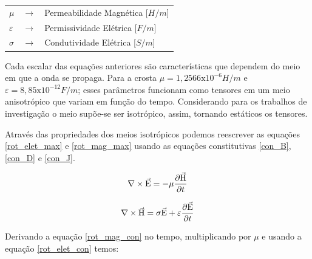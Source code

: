	        {\footnotesize \noindent
            
            \begin{table}[H]
             \begin{tabular*}{1cm}{p{0.05cm}p{0.1cm}p{10cm}}
               {\footnotesize $\mu$}          & {\footnotesize $\rightarrow$} & {\footnotesize Permeabilidade Magnética [$H/m$] }\\
               {\footnotesize $\varepsilon$}  & {\footnotesize $\rightarrow$} & {\footnotesize Permissividade Elétrica [$F/m$] }\\
               {\footnotesize $\sigma$}       & {\footnotesize $\rightarrow$} & {\footnotesize Condutividade Elétrica [$S/m$]} \\
             \end{tabular*}

            \end{table}}
	    
	    
            Cada escalar das equações anteriores são características que dependem do meio em que a onda se propaga. Para a crosta $\mu = 1,2566\textrm{x}10^{-6} H/m$ e $\varepsilon = 8,85
            \textrm{x}10^{-12} F/m$; esses parâmetros funcionam como tensores em um meio
            anisotrópico que variam em função do tempo. Considerando para os 
            trabalhos de investigação o meio supõe-se ser isotrópico, assim, 
            tornando estáticos os tensores.
	
            Através das propriedades dos meios isotrópicos podemos reescrever as equações \ref{rot_elet_max} e \ref{rot_mag_max} usando as equações constitutivas \ref{con_B}, \ref{con_D} e \ref{con_J}.
            
            \begin{equation}
                \label{rot_elet_con}
                \nabla \times \vec{\textrm{E}} = - \mu \dfrac{\partial \vec{\textrm{H}}}{\partial t}
            \end{equation}
            
            \begin{equation}
                \label{rot_mag_con}
                \nabla \times \vec{\textrm{H}} = \sigma \vec{\textrm{E}} + \varepsilon \dfrac{\partial \vec{\textrm{E}}}{\partial t}
            \end{equation}
            
            Derivando a equação \ref{rot_mag_con} no tempo, multiplicando por $\mu$ e usando a equação \ref{rot_elet_con} temos:
            
